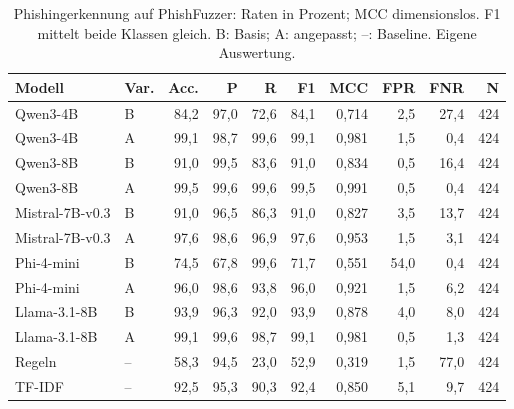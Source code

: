 \begin{table}[htbp]
\centering\scriptsize
\caption{Phishingerkennung auf PhishFuzzer: Raten in Prozent; MCC dimensionslos. F1 mittelt beide Klassen gleich. B: Basis; A: angepasst; –: Baseline. Eigene Auswertung.}
\label{tab:result-phishing-0}
\begin{tabular}{llrrrrrrrr}
\toprule
Modell & Var. & Acc. & P & R & F1 & MCC & FPR & FNR & N \\
\midrule
Qwen3-4B & B & 84{,}2 & 97{,}0 & 72{,}6 & 84{,}1 & 0{,}714 & 2{,}5 & 27{,}4 & 424 \\
Qwen3-4B & A & 99{,}1 & 98{,}7 & 99{,}6 & 99{,}1 & 0{,}981 & 1{,}5 & 0{,}4 & 424 \\
Qwen3-8B & B & 91{,}0 & 99{,}5 & 83{,}6 & 91{,}0 & 0{,}834 & 0{,}5 & 16{,}4 & 424 \\
Qwen3-8B & A & 99{,}5 & 99{,}6 & 99{,}6 & 99{,}5 & 0{,}991 & 0{,}5 & 0{,}4 & 424 \\
Mistral-7B-v0.3 & B & 91{,}0 & 96{,}5 & 86{,}3 & 91{,}0 & 0{,}827 & 3{,}5 & 13{,}7 & 424 \\
Mistral-7B-v0.3 & A & 97{,}6 & 98{,}6 & 96{,}9 & 97{,}6 & 0{,}953 & 1{,}5 & 3{,}1 & 424 \\
Phi-4-mini & B & 74{,}5 & 67{,}8 & 99{,}6 & 71{,}7 & 0{,}551 & 54{,}0 & 0{,}4 & 424 \\
Phi-4-mini & A & 96{,}0 & 98{,}6 & 93{,}8 & 96{,}0 & 0{,}921 & 1{,}5 & 6{,}2 & 424 \\
Llama-3.1-8B & B & 93{,}9 & 96{,}3 & 92{,}0 & 93{,}9 & 0{,}878 & 4{,}0 & 8{,}0 & 424 \\
Llama-3.1-8B & A & 99{,}1 & 99{,}6 & 98{,}7 & 99{,}1 & 0{,}981 & 0{,}5 & 1{,}3 & 424 \\
Regeln & – & 58{,}3 & 94{,}5 & 23{,}0 & 52{,}9 & 0{,}319 & 1{,}5 & 77{,}0 & 424 \\
TF-IDF & – & 92{,}5 & 95{,}3 & 90{,}3 & 92{,}4 & 0{,}850 & 5{,}1 & 9{,}7 & 424 \\
\bottomrule
\end{tabular}
\end{table}


